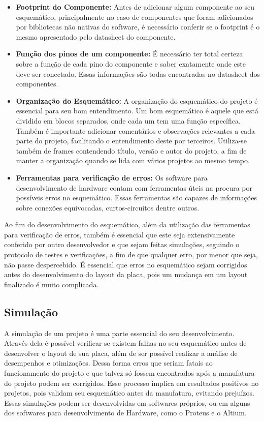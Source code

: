 \begin{itemize}
    \item \textbf{Footprint do Componente:}
    Antes de adicionar algum componente ao seu esquemático, principalmente no caso de componentes que foram adicionados por bibliotecas não nativas do software, é necessário conferir se o footprint é o mesmo apresentado pelo datasheet do componente. 
    \item \textbf{Função dos pinos de um componente:}
    É necessário ter total certeza sobre a função de cada pino do componente e saber exatamente onde este deve ser conectado.  Essas informações são todas encontradas no datasheet dos componentes.
    \item \textbf{Organização do Esquemático:}
    A organização do esquemático do projeto é essencial para seu bom entendimento. Um bom esquemático é aquele que está dividido em blocos separados, onde cada um tem uma função específica. Também é  importante adicionar comentários e observações relevantes a cada parte do projeto, facilitando o entendimento deste por terceiros. Utiliza-se também de frames contendendo título, versão e autor do projeto, a fim de manter a organização quando se lida com vários projetos ao mesmo tempo.
    \item \textbf{Ferramentas para verificação de erros:}
    Os software para desenvolvimento de hardware contam com ferramentas úteis na procura por possíveis erros no esquemático. Essas ferramentas são capazes de informações sobre conexões equivocadas, curtos-circuitos dentre outros.
\end{itemize}

Ao fim do desenvolvimento do esquemático, além da utilização das ferramentas para verificação de erros, também é essencial que este seja extensivamente conferido por outro desenvolvedor e que sejam feitas simulações, seguindo o protocolo de testes e verificações, a fim de que qualquer erro, por menor que seja, não passe despercebido. É essencial que erros no esquemático sejam corrigidos antes do desenvolvimento do layout da placa, pois um mudança em um layout finalizado é muito complicada.


\subsection{Simulação}

A simulação de um projeto é uma parte essencial do seu desenvolvimento. Através dela é possível verificar se existem falhas no seu esquemático antes de desenvolver o layout de sua placa, além de ser possível realizar a análise de desempenhos e  otimizações. Dessa forma erros que seriam fatais ao funcionamento do projeto e que talvez só fossem encontrados após a manufatura do projeto podem ser corrigidos. Esse processo implica em resultados positivos no projetos, pois validam seu esquemático antes da manufatura, evitando prejuízos. Essas simulações podem ser desenvolvidas em softwares próprios, ou em alguns dos softwares para desenvolvimento de Hardware, como o Proteus e o Altium.

